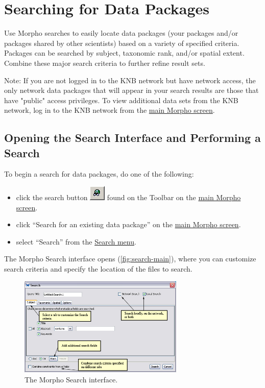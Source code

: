 \section{Searching for Data Packages} \label{sec:searching}

Use Morpho searches to easily locate data packages (your packages and/or
packages shared by other scientists) based on a variety of specified
criteria. Packages can be searched by subject, taxonomic rank, and/or
spatial extent. Combine these major search criteria to further refine
result sets. 

Note: If you are not logged in to the KNB network but have network
access, the only network data packages that will appear in your search
results are those that have "public" access privileges. To view
additional data sets from the KNB network, log in to the KNB network
from the \hyperref[sec:main]{main Morpho screen}.

\subsection{Opening the Search Interface and Performing a Search}

To begin a search for data packages, do one of the following:
\begin{itemize}
  \setlength{\parskip}{1pt}
  \item click the search button
    \includegraphics[scale=0.7]{images/button-search.png} found on the
    Toolbar on the \hyperref[sec:main]{main Morpho screen}.
  \item click ``Search for an existing data package'' on the
    \hyperref[sec:main]{main Morpho screen}.
  \item select ``Search'' from the \hyperref[sec:menu-search]{Search
    menu}.
\end{itemize}

The Morpho Search interface opens (\autoref{fig:search-main}), where you
can customize search criteria and specify the location of the files to
search.

\begin{figure}
  \centering
    \includegraphics[width=0.7\textwidth]{images/search-main.jpg}
  \caption{The Morpho Search interface.}
  \label{fig:search-main}
\end{figure}

